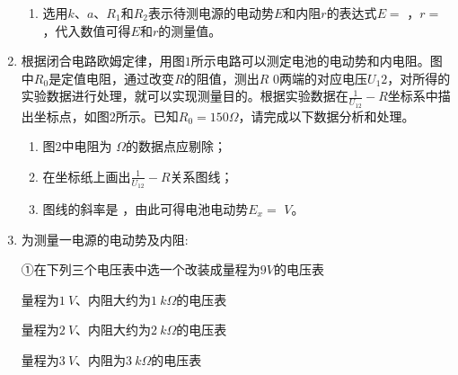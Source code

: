 \begin{enumerate}[leftmargin=0em]
\begin{enumerate}
\item 
选用$ k $、$ a $、$ R_{1} $和$ R_{2} $表示待测电源的电动势$ E $和内阻$ r $的表达式$ E= $  
，$ r= $  
，代入数值可得$ E $和$ r $的测量值。





\end{enumerate}






\newpage
\item 
{}
根据闭合电路欧姆定律，用图$ 1 $所示电路可以测定电池的电动势和内电阻。图中$ R _ 0 $是定值电阻，通过改变$ R $的阻值，测出$ R $ $ 0 $两端的对应电压$ U_{1} 2 $，对所得的实验数据进行处理，就可以实现测量目的。根据实验数据在$\frac { 1 } { U _ { 12 } } - R$坐标系中描出坐标点，如图$ 2 $所示。已知$R _ { 0 } = 150 \Omega$，请完成以下数据分析和处理。
\begin{figure}[h!]
\centering

\end{figure}


\begin{enumerate}
\renewcommand{\labelenumi}{\arabic{enumi}.}
\item
图$ 2 $中电阻为  
$ \Omega $的数据点应剔除；
\item 
在坐标纸上画出$\frac { 1 } { U _ { 12 } } - R $关系图线；
\item 
图线的斜率是  
，由此可得电池电动势$ E_x= $  
$ V $。



\end{enumerate}





\item
{}
为测量一电源的电动势及内阻:

①在下列三个电压表中选一个改装成量程为$ 9V $的电压表

\threechoices
{量程为$ 1\ V $、内阻大约为$ 1 \ k\Omega $的电压表 
}
{量程为$ 2\ V $、内阻大约为$ 2 \ k\Omega $的电压表
}
{量程为$ 3\ V $、内阻为$ 3 \ k\Omega $的电压表
}


\end{enumerate}
